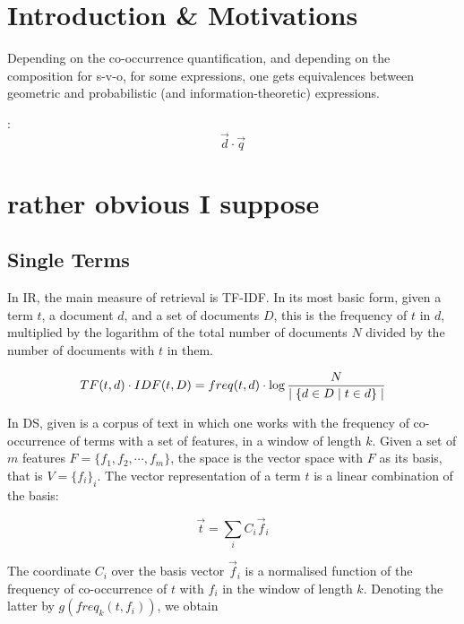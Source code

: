 \section{Introduction \& Motivations}


Depending on the co-occurrence quantification, and depending on the composition for s-v-o, for some expressions, one  gets equivalences between geometric and probabilistic (and information-theoretic) expressions.



\cite{Wong/Yao:95}:
\[
\vec{d} \cdot \vec{q}
\]

\section{rather obvious I suppose}

\subsection{Single Terms}

In IR, the main measure of retrieval is TF-IDF. In its most basic form, given a term $t$,  a document $d$, and a set of documents $D$, this is the frequency  of   $t$  in $d$, multiplied by  the logarithm of the  total number of documents $N$ divided by the number of documents with $t$ in them. 

\begin{equation}
\label{tf-idf}
TF(t,d) \cdot IDF(t, D) = freq(t, d) \cdot \log{{N} \over {\mid \{d \in D \mid t \in d\}\mid}}
\end{equation}

In DS, given is a corpus of text in which one works with the frequency of co-occurrence of terms with a set of  features, in a window of length $k$. Given a set of $m$ features $F = \{f_1, f_2, \cdots, f_m\}$, the space is the vector space with $F$ as its basis, that is $V = \{f_i\}_i$. The vector representation of a term $t$ is a linear combination of the basis:

\begin{equation}
\label{vector-word}
\overrightarrow{t}  = \sum_i  C_i  \overrightarrow{f}_i
\end{equation}

The coordinate $C_i$ over the basis vector $\overrightarrow{f}_i$ is a normalised function of the frequency of co-occurrence of $t$ with $f_i$ in the window of length $k$. Denoting the latter by  $g(freq_k(t,f_i))$, we obtain 

